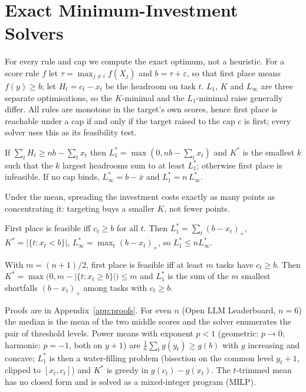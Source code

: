 \section{Exact Minimum-Investment Solvers}
\label{sec:method}

For every rule and cap we compute the exact optimum, not a heuristic. For a score rule $f$ let $\tau=\max_{j\ne i}f(X_j)$ and $b=\tau+\varepsilon$, so that first place means $f(y)\ge b$; let $H_t=c_t-x_t$ be the headroom on task $t$. $L_1$, $K$ and $L_\infty$ are three separate optimisations, so the $K$-minimal and the $L_1$-minimal raise generally differ. All rules are monotone in the target's own scores, hence first place is reachable under a cap if and only if the target raised to the cap $c$ is first; every solver uses this as its feasibility test.

\begin{proposition}[Mean]\label{prop:mean}
If $\sum_tH_t\ge nb-\sum_tx_t$ then $L_1^\ast=\max(0,nb-\sum_tx_t)$ and $K^\ast$ is the smallest $k$ such that the $k$ largest headrooms sum to at least $L_1^\ast$; otherwise first place is infeasible. If no cap binds, $L_\infty^\ast=b-\bar x$ and $L_1^\ast=n\,L_\infty^\ast$.
\end{proposition}
Under the mean, spreading the investment costs exactly as many points as concentrating it: targeting buys a smaller $K$, not fewer points.

\begin{proposition}[Minimum]\label{prop:min}
First place is feasible iff $c_t\ge b$ for all $t$. Then $L_1^\ast=\sum_t(b-x_t)_+$, $K^\ast=|\{t:x_t<b\}|$, $L_\infty^\ast=\max_t(b-x_t)_+$, so $L_1^\ast\le nL_\infty^\ast$.
\end{proposition}

\begin{proposition}\label{prop:median}
With $m=(n+1)/2$, first place is feasible iff at least $m$ tasks have $c_t\ge b$. Then $K^\ast=\max\bigl(0,m-|\{t:x_t\ge b\}|\bigr)\le m$ and $L_1^\ast$ is the sum of the $m$ smallest shortfalls $(b-x_t)_+$ among tasks with $c_t\ge b$.
\end{proposition}
Proofs are in Appendix~\ref{app:proofs}. For even $n$ (Open LLM Leaderboard, $n=6$) the median is the mean of the two middle scores and the solver enumerates the pair of threshold levels. Power means with exponent $p<1$ (geometric: $p\to0$; harmonic: $p=-1$, both on $y+1$) are $\frac1n\sum_tg(y_t)\ge g(b)$ with $g$ increasing and concave; $L_1^\ast$ is then a water-filling problem (bisection on the common level $y_t+1$, clipped to $[x_t,c_t]$) and $K^\ast$ is greedy in $g(c_t)-g(x_t)$. The $t$-trimmed mean has no closed form and is solved as a mixed-integer program (MILP).

